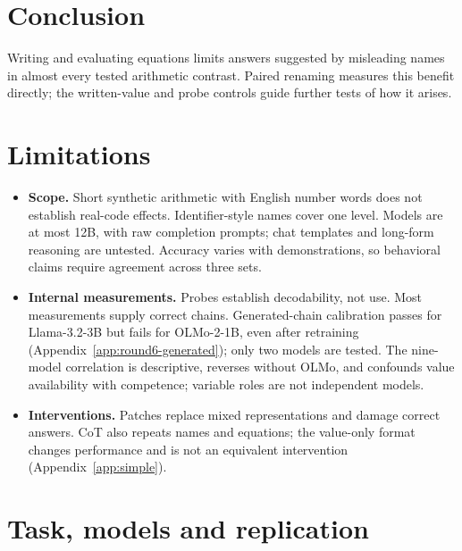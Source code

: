 \documentclass[11pt]{article}
\begin{document}
\section{Conclusion}

Writing and evaluating equations limits answers suggested by misleading names in almost
every tested arithmetic contrast. Paired renaming measures this benefit directly;
the written-value and probe controls guide further tests of how it arises.

\section*{Limitations}

\begin{itemize}
\item \textbf{Scope.} Short synthetic arithmetic with English number words does not establish
real-code effects. Identifier-style names cover one level. Models are at most 12B, with raw
completion prompts; chat templates and long-form reasoning are untested. Accuracy varies
with demonstrations, so behavioral claims require agreement across three sets.
\item \textbf{Internal measurements.} Probes establish decodability, not use. Most measurements
supply correct chains. Generated-chain calibration passes for Llama-3.2-3B but fails for
OLMo-2-1B, even after retraining (Appendix~\ref{app:round6-generated}); only two models are tested.
The nine-model correlation is descriptive, reverses without OLMo, and confounds value
availability with competence; variable roles are not independent models.
\item \textbf{Interventions.} Patches replace mixed representations and damage correct answers.
CoT also repeats names and equations; the value-only format changes performance and is not
an equivalent intervention (Appendix~\ref{app:simple}).
\end{itemize}



\appendix

\section{Task, models and replication}
\label{app:task}
\end{document}
